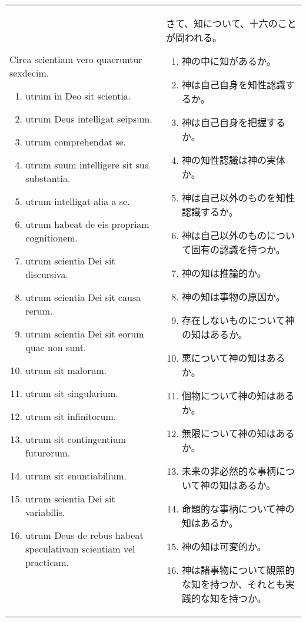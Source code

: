 \documentclass[10pt]{jsarticle} %
\begin{document}
\begin{longtable}{p{21em}p{21em}}
Circa scientiam vero quaeruntur
sexdecim. 
\begin{enumerate}
 \item utrum in Deo sit scientia.
 \item utrum Deus intelligat seipsum.
 \item utrum comprehendat se.
 \item utrum suum intelligere sit sua substantia.
 \item utrum intelligat alia a se.
 \item utrum habeat de eis propriam cognitionem. 
 \item utrum scientia Dei sit discursiva.
 \item utrum scientia Dei sit causa rerum.
 \item utrum scientia Dei sit eorum quae non sunt.
 \item utrum sit malorum.
 \item utrum sit singularium.
 \item utrum sit infinitorum.
 \item utrum sit contingentium futurorum.
 \item utrum sit enuntiabilium.
 \item utrum scientia Dei sit variabilis.
 \item utrum Deus de rebus habeat speculativam scientiam vel practicam. 
\end{enumerate}
&
さて、知について、十六のことが問われる。
\begin{enumerate}
 \item 神の中に知があるか。
 \item 神は自己自身を知性認識するか。
 \item 神は自己自身を把握するか。
 \item 神の知性認識は神の実体か。
 \item 神は自己以外のものを知性認識するか。
 \item 神は自己以外のものについて固有の認識を持つか。
 \item 神の知は推論的か。
 \item 神の知は事物の原因か。
 \item 存在しないものについて神の知はあるか。
 \item 悪について神の知はあるか。
 \item 個物について神の知はあるか。
 \item 無限について神の知はあるか。
 \item 未来の非必然的な事柄について神の知はあるか。
 \item 命題的な事柄について神の知はあるか。
 \item 神の知は可変的か。
 \item 神は諸事物について観照的な知を持つか、それとも実践的な知を持つか。
\end{enumerate}

\\
\end{longtable}
\end{document}
